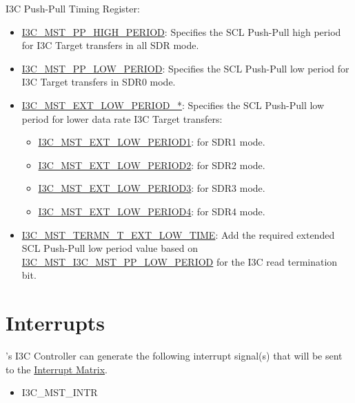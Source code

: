 \documentclass[main\_\_EN.tex]{subfiles}
\begin{document}
I3C Push-Pull Timing Register:
\begin{itemize}
    \item \hyperref[fielddesc:I3CMSTREGI3CMSTPPHIGHPERIOD]{I3C\_MST\_PP\_HIGH\_PERIOD}: Specifies the SCL Push-Pull high period for I3C Target transfers in all SDR mode.
    \item \hyperref[fielddesc:I3CMSTREGI3CMSTPPLOWPERIOD]{I3C\_MST\_PP\_LOW\_PERIOD}: Specifies the SCL Push-Pull low period for I3C Target transfers in SDR0 mode.
    \item \hyperref[fielddesc:I3CMSTREGI3CMSTEXTLOWPERIOD1]{I3C\_MST\_EXT\_LOW\_PERIOD\_*}: Specifies the SCL Push-Pull low period for lower data rate I3C Target transfers:
    \begin{itemize}
        \item \hyperref[fielddesc:I3CMSTREGI3CMSTEXTLOWPERIOD1]{I3C\_MST\_EXT\_LOW\_PERIOD1}: for SDR1 mode.
        \item \hyperref[fielddesc:I3CMSTREGI3CMSTEXTLOWPERIOD2]{I3C\_MST\_EXT\_LOW\_PERIOD2}: for SDR2 mode.
        \item \hyperref[fielddesc:I3CMSTREGI3CMSTEXTLOWPERIOD3]{I3C\_MST\_EXT\_LOW\_PERIOD3}: for SDR3 mode.
        \item \hyperref[fielddesc:I3CMSTREGI3CMSTEXTLOWPERIOD4]{I3C\_MST\_EXT\_LOW\_PERIOD4}: for SDR4 mode.
    \end{itemize}
    \item \hyperref[fielddesc:I3CMSTREGI3CMSTTERMNTEXTLOWTIME]{I3C\_MST\_TERMN\_T\_EXT\_LOW\_TIME}: Add the required extended SCL Push-Pull low period value based on \hyperref[fielddesc:I3CMSTREGI3CMSTPPLOWPERIOD]{I3C\_MST\_I3C\_MST\_PP\_LOW\_PERIOD} for the I3C read termination bit.
\end{itemize}





\section{Interrupts}


\chipname{}'s I3C Controller can generate the following interrupt signal(s) that will be sent to the \hyperref[mod:intmtrx]{Interrupt Matrix}.

    \begin{itemize}
        \item I3C\_MST\_INTR
    \end{itemize}
\end{document}
